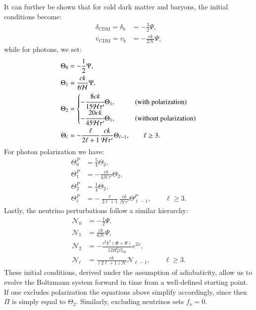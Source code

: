 \documentclass{aa}
\numberwithin{equation}{section}
\numberwithin{table}{section}
\numberwithin{figure}{section}
\begin{document}
It can further be shown that for cold dark matter and baryons, the initial conditions become:
\begin{align}
\delta_\text{CDM} = \delta_b &= -\frac{3}{2}\Psi, \\
v_\text{CDM} = v_b &= -\frac{ck}{2\mathcal{H}} \Psi,
\end{align}
while for photons, we set:
\begin{align}
\Theta_0 &= -\frac{1}{2} \Psi, \\
\Theta_1 &= \frac{ck}{6\mathcal{H}} \Psi, \\
\Theta_2 &= \begin{cases}-\cfrac{8ck}{15\mathcal{H} \tau'} \Theta_1, \qquad&\text{(with polarization)} \\
  -\cfrac{20ck}{45\mathcal{H} \tau'} \Theta_1, \hspace{3pt}&\text{(without polarization)}
\end{cases} \label{eq: initial quadrupole} \\
\Theta_\ell &= -\frac{\ell}{2\ell+1} \frac{ck}{\mathcal{H} \tau'} \Theta_{\ell-1}, \qquad \ell \geq 3.
\end{align}
For photon polarization we have:
\begin{align}
\Theta_0^P &= \frac{5}{4} \Theta_2, \\
\Theta_1^P &= -\frac{ck}{4\mathcal{H} \tau'} \Theta_2, \\
\Theta_2^P &= \frac{1}{4} \Theta_2, \\
\Theta_\ell^P &= -\frac{\ell}{2\ell+1} \frac{ck}{\mathcal{H} \tau'} \Theta_{\ell-1}^P, \qquad \ell \geq 3. \label{eq: initial polarization multipole}
\end{align}
Lastly, the neutrino perturbations follow a similar hierarchy:
\begin{align}
\mathcal{N}_0 &= -\frac{1}{2} \Psi, \\
\mathcal{N}_1 &= \frac{ck}{6\mathcal{H}} \Psi, \\
\mathcal{N}_2 &= -\frac{c^2 k^2  (\Phi + \Psi)}{12 H_0^2\Omega_{\nu0}}e^{2x}, \\
\mathcal{N}_\ell &= \frac{ck}{(2\ell+1)\mathcal{H}} \mathcal{N}_{\ell-1}, \qquad \ell \geq 3.
\end{align}
These initial conditions, derived under the assumption of adiabaticity, allow us to evolve the Boltzmann system forward in time from a well-defined starting point. If one excludes polarization the equations above simplify accordingly, since then $\Pi$ is simply equal to $\Theta_2$. Similarly, excluding neutrinos sets $f_\nu=0$. 
\end{document}
